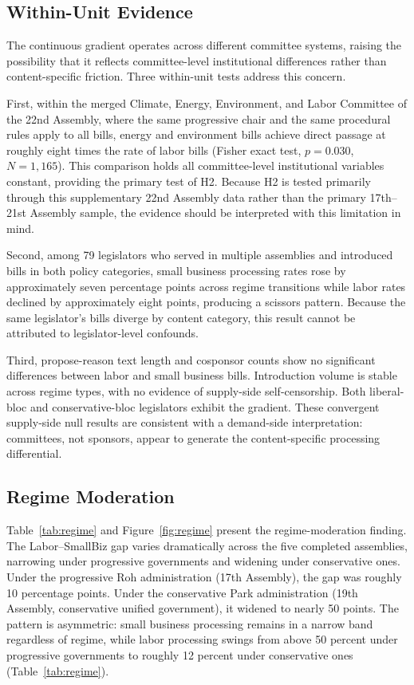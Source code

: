 \documentclass[11pt]{article}
\begin{document}
\subsection{Within-Unit Evidence}

The continuous gradient operates across different committee systems, raising the possibility that it reflects committee-level institutional differences rather than content-specific friction. Three within-unit tests address this concern.

First, within the merged Climate, Energy, Environment, and Labor Committee of the 22nd Assembly, where the same progressive chair and the same procedural rules apply to all bills, energy and environment bills achieve direct passage at roughly eight times the rate of labor bills (Fisher exact test, $p = 0.030$, $N = 1,165$). This comparison holds all committee-level institutional variables constant, providing the primary test of H2. Because H2 is tested primarily through this supplementary 22nd Assembly data rather than the primary 17th--21st Assembly sample, the evidence should be interpreted with this limitation in mind.

Second, among 79 legislators who served in multiple assemblies and introduced bills in both policy categories, small business processing rates rose by approximately seven percentage points across regime transitions while labor rates declined by approximately eight points, producing a scissors pattern. Because the same legislator's bills diverge by content category, this result cannot be attributed to legislator-level confounds.

Third, propose-reason text length and cosponsor counts show no significant differences between labor and small business bills. Introduction volume is stable across regime types, with no evidence of supply-side self-censorship. Both liberal-bloc and conservative-bloc legislators exhibit the gradient. These convergent supply-side null results are consistent with a demand-side interpretation: committees, not sponsors, appear to generate the content-specific processing differential.


\subsection{Regime Moderation}

Table~\ref{tab:regime} and Figure~\ref{fig:regime} present the regime-moderation finding. The Labor--SmallBiz gap varies dramatically across the five completed assemblies, narrowing under progressive governments and widening under conservative ones. Under the progressive Roh administration (17th Assembly), the gap was roughly 10 percentage points. Under the conservative Park administration (19th Assembly, conservative unified government), it widened to nearly 50 points. The pattern is asymmetric: small business processing remains in a narrow band regardless of regime, while labor processing swings from above 50 percent under progressive governments to roughly 12 percent under conservative ones (Table~\ref{tab:regime}).
\end{document}

